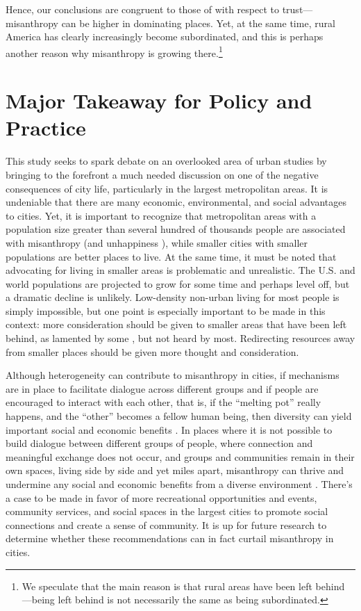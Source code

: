 \documentclass[11pt, letterpaper]{article}
\begin{document}
\begin{spacing}{1.4}
Hence, our conclusions are congruent to those of \citet{schilke15} with respect to trust---misanthropy can be higher in dominating places. Yet, at the same
 time, rural America has clearly increasingly become subordinated, and this is perhaps another reason why misanthropy is growing there.\footnote{We speculate that the main reason is that rural areas have been left behind \citep{hansonCityJournalautumn15,hansonCJ17winter17,fullerNYT17monD}---being left behind is not necessarily the same as being subordinated.}  

\section*{Major Takeaway for Policy and Practice}

This study seeks to spark debate on an overlooked area of urban studies by bringing to the forefront a much needed discussion on one of the negative consequences of city life, particularly in the largest metropolitan areas. It is undeniable that there are many economic, environmental, and social advantages to cities. Yet, it is important to recognize that metropolitan areas with a population size greater than several hundred of thousands people are associated with misanthropy (and unhappiness \citep{aok-ls_fisher16}), while smaller cities with smaller populations are better places to live. At the same time, it must be noted that advocating for living in smaller areas is problematic and unrealistic. The U.S. and world populations are projected to grow for some time and perhaps level off, but a dramatic decline is unlikely. Low-density non-urban living for most people is simply impossible, but one point is especially important to be made in this context: more consideration should be given to smaller areas that have been left behind, as lamented by some \citep[e.g.,][]{fullerNYT17monD,hansonCityJournalautumn15}, but not heard by most. Redirecting resources away from smaller places should be given more thought and consideration.

Although heterogeneity can contribute to misanthropy in cities, if mechanisms are in place to facilitate dialogue across different groups and if people are encouraged to interact with each other, that is, if the ``melting pot'' really happens, and the ``other'' becomes a fellow human being, then diversity can yield important social and economic benefits \citep{rodriguez2019does}.  In places where it is not possible to build dialogue between different groups of people, where connection and meaningful exchange does not occur, and groups and communities remain in their own spaces, living side by side and yet miles apart, misanthropy can thrive and undermine any social and economic benefits from a diverse environment \citep{rodriguez2019does}. There's a case to be made in favor of more recreational opportunities and events, community services, and social spaces in the largest cities to promote social connections and create a sense of community. It is up for future research to determine whether these recommendations can  in fact curtail misanthropy in cities.


\end{spacing}
\end{document}
